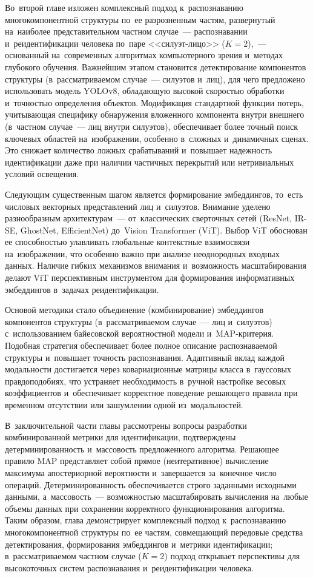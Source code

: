 Во~второй главе изложен комплексный подход к~распознаванию
многокомпонентной структуры по~ее разрозненным частям, развернутый
на~наиболее представительном частном случае~--- распознавании
и~реидентификации человека по~паре <<силуэт-лицо>> ($K=2$),~--- основанный
на~современных алгоритмах
компьютерного зрения и~методах глубокого обучения. Важнейшим этапом
становится детектирование компонентов структуры (в~рассматриваемом
случае~--- силуэтов и~лиц), для чего предложено
использовать модель YOLOv8, обладающую высокой скоростью обработки
и~точностью определения объектов. Модификация стандартной функции
потерь, учитывающая специфику обнаружения вложенного компонента
внутри внешнего (в~частном случае~--- лиц внутри силуэтов),
обеспечивает более точный поиск ключевых областей на~изображении,
особенно в~сложных и~динамичных сценах. Это снижает количество ложных
срабатываний и~повышает надежность идентификации даже при наличии
частичных перекрытий или нетривиальных условий освещения.

Следующим существенным шагом является формирование эмбеддингов, то~есть
числовых векторных представлений лиц и~силуэтов. Внимание уделено
разнообразным архитектурам~--- от~классических сверточных сетей
(ResNet, IR-SE, GhostNet, EfficientNet) до~Vision Transformer (ViT).
Выбор ViT обоснован ее способностью улавливать глобальные контекстные
взаимосвязи на~изображении, что особенно важно при анализе
неоднородных входных данных. Наличие гибких механизмов внимания
и~возможность масштабирования делают ViT перспективным инструментом
для формирования информативных эмбеддингов в~задачах реидентификации.

Основой методики стало объединение (комбинирование)
эмбеддингов компонентов структуры (в~рассматриваемом случае~--- лиц
и~силуэтов) с~использованием байесовской вероятностной
модели и~MAP-критерия. Подобная стратегия обеспечивает более полное
описание распознаваемой структуры и~повышает точность распознавания. Адаптивный вклад
каждой модальности достигается через ковариационные матрицы класса
в~гауссовых правдоподобиях, что устраняет необходимость в~ручной
настройке весовых коэффициентов и~обеспечивает корректное поведение
решающего правила при временном отсутствии или зашумлении одной из~модальностей.

В~заключительной части главы рассмотрены вопросы разработки
комбинированной метрики для идентификации, подтверждены
детерминированность и~массовость предложенного алгоритма. Решающее
правило MAP представляет собой прямое (неитеративное) вычисление
максимума апостериорной вероятности и~завершается за~конечное число
операций. Детерминированность обеспечивается строго заданными
исходными данными, а~массовость~--- возможностью масштабировать
вычисления на~любые объемы данных при сохранении корректного
функционирования алгоритма. Таким образом, глава демонстрирует
комплексный подход к~распознаванию многокомпонентной структуры
по~ее частям, совмещающий передовые средства детектирования,
формирования эмбеддингов и~метрики идентификации; в~рассматриваемом
частном случае ($K=2$) подход открывает
перспективы для высокоточных систем распознавания и~реидентификации
человека.

